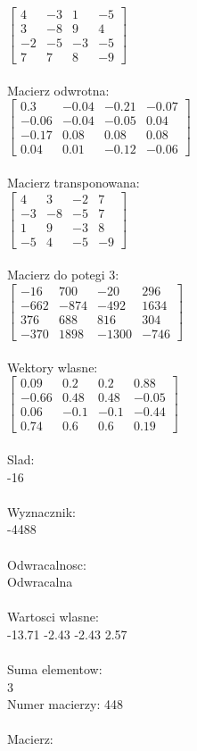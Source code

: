 \documentclass[a4paper,12pt]{article}
\begin{document}
$\begin{bmatrix} 4&-3&1&-5\\3&-8&9&4\\-2&-5&-3&-5\\7&7&8&-9 \end{bmatrix}$
\\
\\
Macierz odwrotna:\\

$\begin{bmatrix} 0.3&-0.04&-0.21&-0.07\\-0.06&-0.04&-0.05&0.04\\-0.17&0.08&0.08&0.08\\0.04&0.01&-0.12&-0.06 \end{bmatrix}$
\\
\\
Macierz transponowana:\\

$\begin{bmatrix} 4&3&-2&7\\-3&-8&-5&7\\1&9&-3&8\\-5&4&-5&-9 \end{bmatrix}$
\\
\\
Macierz do potegi 3:\\

$\begin{bmatrix} -16&700&-20&296\\-662&-874&-492&1634\\376&688&816&304\\-370&1898&-1300&-746 \end{bmatrix}$
\\
\\
Wektory wlasne:\\

$\begin{bmatrix} 0.09&0.2&0.2&0.88\\-0.66&0.48&0.48&-0.05\\0.06&-0.1&-0.1&-0.44\\0.74&0.6&0.6&0.19 \end{bmatrix}$
\\
\\
Slad:\\
-16
\\
\\
Wyznacznik:\\
-4488
\\
\\
Odwracalnosc:\\
Odwracalna
\\
\\
Wartosci wlasne:\\
-13.71 -2.43 -2.43 2.57
\\
\\
Suma elementow:\\
3
\\
\newpage
Numer macierzy:
448
\\
\\
Macierz:\\
\end{document}
